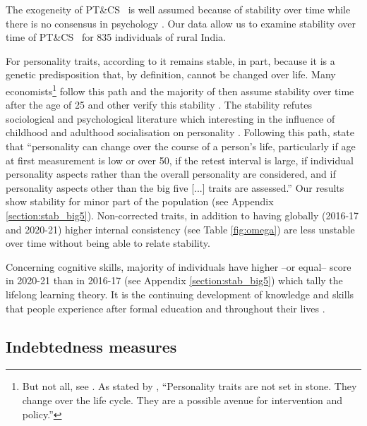 \documentclass[a4paper, 11pt, onecolumn]{article}
\newcommand{\PTCS}{PT\&CS}
\begin{document}
The exogeneity of \PTCS~ is well assumed because of stability over time while there is no consensus in psychology \citep{Ardelt2000, Deary2014}.
Our data allow us to examine stability over time of \PTCS~ for 835 individuals of rural India.

For personality traits, according to \cite{Costa1997, McCrae2000} it remains stable, in part, because it is a genetic predisposition that, by definition, cannot be changed over life.
Many economists\footnote{But not all, see \cite{Borghans2008, Almlund2011, Heckman2011}. As stated by \cite{Heckman2011}, ``Personality traits are not set in stone. They change over the life cycle. They are a possible avenue for intervention and policy.''} follow this path and the majority of then assume stability over time after the age of 25 and other verify this stability \citep{CobbClark2011}.
The stability refutes sociological and psychological literature which interesting in the influence of childhood and adulthood socialisation on personality \citep{Mortimer1978, Moen1995}.
Following this path, \cite{Ardelt2000} state that ``personality can change over the course of a person's life, particularly if age at first measurement is low or over 50, if the retest interval is large, if individual personality aspects rather than the overall personality are considered, and if personality aspects other than the big five [...] traits are assessed.''
Our results show stability for minor part of the population (see Appendix \ref{section:stab_big5}).
Non-corrected traits, in addition to having globally (2016-17 and 2020-21) higher internal consistency (see Table \ref{fig:omega}) are less unstable over time without being able to relate stability.

Concerning cognitive skills, majority of individuals have higher --or equal-- score in 2020-21 than in 2016-17 (see Appendix \ref{section:stab_big5}) which tally the lifelong learning theory.
It is the continuing development of knowledge and skills that people experience after formal education and throughout their lives \citep{London2011}.



	\subsection{Indebtedness measures}
\end{document}
